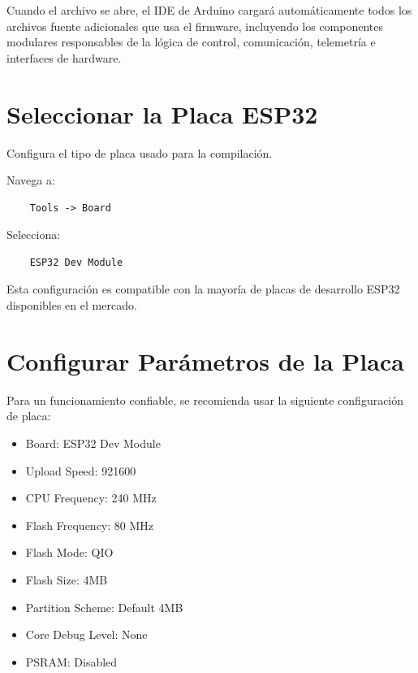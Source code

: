 Cuando el archivo se abre, el IDE de Arduino cargará automáticamente todos los archivos fuente adicionales que usa
el firmware, incluyendo los componentes modulares responsables de la lógica de control, comunicación, telemetría
e interfaces de hardware.

\section{Seleccionar la Placa ESP32}

Configura el tipo de placa usado para la compilación.

Navega a:

\begin{verbatim}
    Tools -> Board
\end{verbatim}

Selecciona:

\begin{verbatim}
    ESP32 Dev Module
\end{verbatim}

Esta configuración es compatible con la mayoría de placas de desarrollo ESP32 disponibles en el mercado.

\section{Configurar Parámetros de la Placa}

Para un funcionamiento confiable, se recomienda usar la siguiente configuración de placa:

\begin{itemize}

    \item Board: ESP32 Dev Module

    \item Upload Speed: 921600

    \item CPU Frequency: 240 MHz

    \item Flash Frequency: 80 MHz

    \item Flash Mode: QIO

    \item Flash Size: 4MB

    \item Partition Scheme: Default 4MB

    \item Core Debug Level: None

    \item PSRAM: Disabled

\end{itemize}

